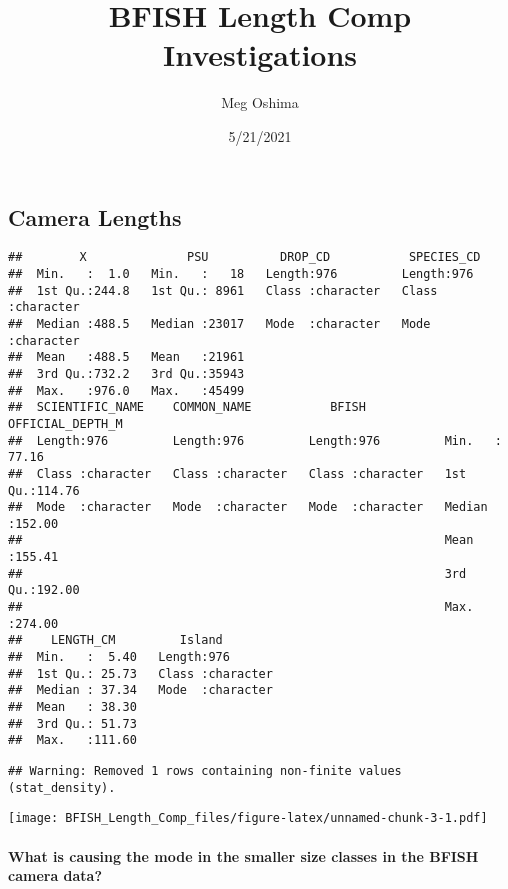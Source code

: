 \documentclass[
]{article}
\title{BFISH Length Comp Investigations}
\author{Meg Oshima}
\date{5/21/2021}
\begin{document}
\maketitle

\hypertarget{camera-lengths}{%
\subsection{Camera Lengths}\label{camera-lengths}}

\begin{verbatim}
##        X              PSU          DROP_CD           SPECIES_CD       
##  Min.   :  1.0   Min.   :   18   Length:976         Length:976        
##  1st Qu.:244.8   1st Qu.: 8961   Class :character   Class :character  
##  Median :488.5   Median :23017   Mode  :character   Mode  :character  
##  Mean   :488.5   Mean   :21961                                        
##  3rd Qu.:732.2   3rd Qu.:35943                                        
##  Max.   :976.0   Max.   :45499                                        
##  SCIENTIFIC_NAME    COMMON_NAME           BFISH           OFFICIAL_DEPTH_M
##  Length:976         Length:976         Length:976         Min.   : 77.16  
##  Class :character   Class :character   Class :character   1st Qu.:114.76  
##  Mode  :character   Mode  :character   Mode  :character   Median :152.00  
##                                                           Mean   :155.41  
##                                                           3rd Qu.:192.00  
##                                                           Max.   :274.00  
##    LENGTH_CM         Island         
##  Min.   :  5.40   Length:976        
##  1st Qu.: 25.73   Class :character  
##  Median : 37.34   Mode  :character  
##  Mean   : 38.30                     
##  3rd Qu.: 51.73                     
##  Max.   :111.60
\end{verbatim}

\begin{verbatim}
## Warning: Removed 1 rows containing non-finite values (stat_density).
\end{verbatim}

\texttt{[image: BFISH\_Length\_Comp\_files/figure-latex/unnamed-chunk-3-1.pdf]}

\hypertarget{what-is-causing-the-mode-in-the-smaller-size-classes-in-the-bfish-camera-data}{%
\paragraph{What is causing the mode in the smaller size classes in the
BFISH camera
data?}\label{what-is-causing-the-mode-in-the-smaller-size-classes-in-the-bfish-camera-data}}
\end{document}
